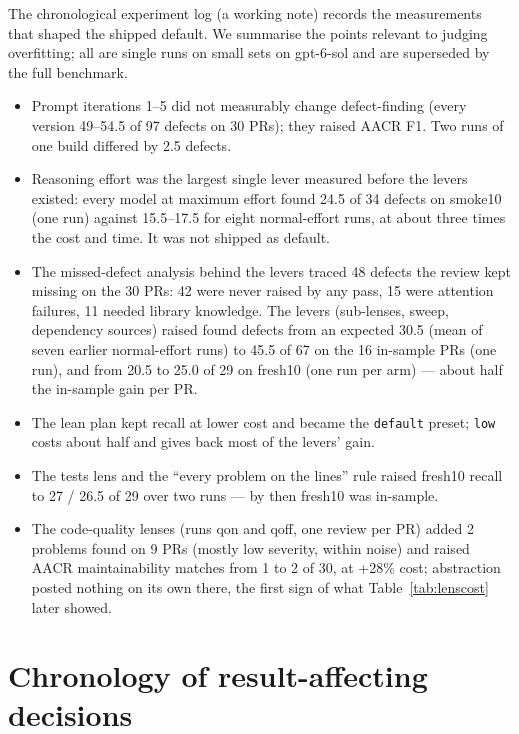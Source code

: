 \documentclass[11pt,a4paper]{article}
\newcommand{\code}[1]{\texttt{#1}}
\begin{document}
The chronological experiment log (a working note) records the measurements that
shaped the shipped default. We summarise the points relevant to judging
overfitting; all are single runs on small sets on gpt-6-sol and are
superseded by the full benchmark.
\begin{itemize}
  \item Prompt iterations 1--5 did not measurably change defect-finding
  (every version 49--54.5 of 97 defects on 30 PRs); they raised AACR F1.
  Two runs of one build differed by 2.5 defects.
  \item Reasoning effort was the largest single lever measured before the
  levers existed: every model at maximum effort found 24.5 of 34 defects on
  smoke10 (one run) against 15.5--17.5 for eight normal-effort runs, at about
  three times the cost and time. It was not shipped as default.
  \item The missed-defect analysis behind the levers traced 48 defects the
  review kept missing on the 30 PRs: 42 were never raised by any pass, 15 were
  attention failures, 11 needed library knowledge. The levers (sub-lenses,
  sweep, dependency sources) raised found defects from an expected 30.5
  (mean of seven earlier normal-effort runs) to 45.5 of 67 on the 16
  in-sample PRs (one run), and from 20.5 to 25.0 of 29 on fresh10 (one run
  per arm) --- about half the in-sample gain per PR.
  \item The lean plan kept recall at lower cost and became the
  \code{default} preset; \code{low} costs about half and gives back most of
  the levers' gain.
  \item The tests lens and the ``every problem on the lines'' rule raised
  fresh10 recall to 27 / 26.5 of 29 over two runs --- by then fresh10 was
  in-sample.
  \item The code-quality lenses (runs qon and qoff, one review per PR) added 2 problems found on 9 PRs
  (mostly low severity, within noise) and raised AACR maintainability matches from 1 to 2 of 30, at +28\% cost; abstraction posted nothing on its
  own there, the first sign of what Table~\ref{tab:lenscost} later showed.
\end{itemize}

\section{Chronology of result-affecting decisions}
\label{app:chron}
\end{document}
